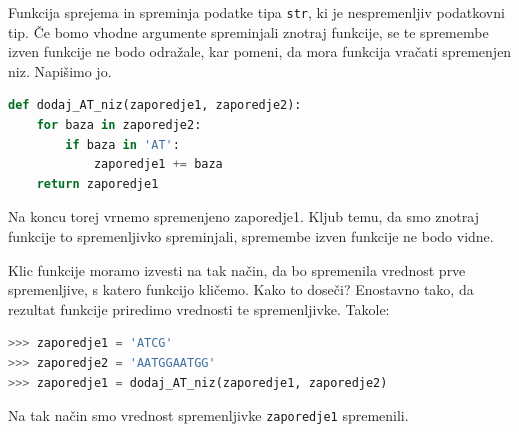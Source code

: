 \begin{resitev}
Funkcija sprejema in spreminja podatke tipa \texttt{str}, ki je nespremenljiv podatkovni tip. Če bomo vhodne argumente spreminjali znotraj funkcije, se te spremembe izven funkcije ne bodo odražale, kar pomeni, da mora funkcija vračati spremenjen niz. Napišimo jo.
\begin{lstlisting}[language=Python, showstringspaces=false]
def dodaj_AT_niz(zaporedje1, zaporedje2):
    for baza in zaporedje2:
        if baza in 'AT':
            zaporedje1 += baza
    return zaporedje1
\end{lstlisting}
Na koncu torej vrnemo spremenjeno zaporedje1. Kljub temu, da smo znotraj funkcije to spremenljivko spreminjali, spremembe izven funkcije ne bodo vidne.

Klic funkcije moramo izvesti na tak način, da bo spremenila vrednost prve spremenljive, s katero funkcijo kličemo. Kako to doseči? Enostavno tako, da rezultat funkcije priredimo vrednosti te spremenljivke. Takole:
\begin{lstlisting}[language=Python, showstringspaces=false]
>>> zaporedje1 = 'ATCG'
>>> zaporedje2 = 'AATGGAATGG'
>>> zaporedje1 = dodaj_AT_niz(zaporedje1, zaporedje2)
\end{lstlisting}
Na tak način smo vrednost spremenljivke \texttt{zaporedje1} spremenili.
\end{resitev}

